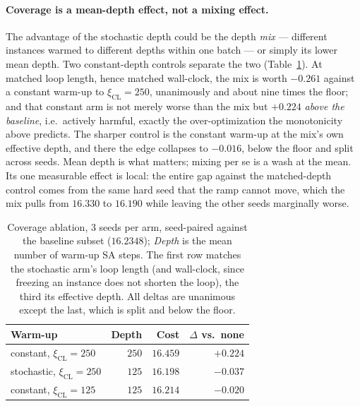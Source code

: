 \documentclass[letterpaper]{article} %
\begin{document}
\paragraph{Coverage is a mean-depth effect, not a mixing effect.}
The advantage of the stochastic depth could be the depth \emph{mix} --- different instances warmed to different depths within one batch --- or simply its lower mean depth. Two constant-depth controls separate the two (Table~\ref{tab:clcov}). At matched loop length, hence matched wall-clock, the mix is worth $-0.261$ against a constant warm-up to $\xi_{\mathrm{CL}} = 250$, unanimously and about nine times the floor; and that constant arm is not merely worse than the mix but $+0.224$ \emph{above the baseline}, i.e.\ actively harmful, exactly the over-optimization the monotonicity above predicts. The sharper control is the constant warm-up at the mix's own effective depth, and there the edge collapses to $-0.016$, below the floor and split across seeds. Mean depth is what matters; mixing per se is a wash at the mean. Its one measurable effect is local: the entire gap against the matched-depth control comes from the same hard seed that the ramp cannot move, which the mix pulls from $16.330$ to $16.190$ while leaving the other seeds marginally worse.

\begin{table}[t]
\centering
\small
\begin{tabular}{lrrr}
\toprule
\textbf{Warm-up} & \textbf{Depth} & \textbf{Cost} & \textbf{$\Delta$ vs.\ none} \\
\midrule
constant, $\xi_{\mathrm{CL}} = 250$ & $250$ & $16.459$ & $+0.224$ \\
stochastic, $\xi_{\mathrm{CL}} = 250$ & $125$ & $\mathbf{16.198}$ & $-0.037$ \\
constant, $\xi_{\mathrm{CL}} = 125$ & $125$ & $16.214$ & $-0.020$ \\
\bottomrule
\end{tabular}
\caption{Coverage ablation, $3$ seeds per arm, seed-paired against the baseline subset ($16.2348$); \emph{Depth} is the mean number of warm-up SA steps. The first row matches the stochastic arm's loop length (and wall-clock, since freezing an instance does not shorten the loop), the third its effective depth. All deltas are unanimous except the last, which is split and below the floor.}
\label{tab:clcov}
\end{table}
\end{document}
